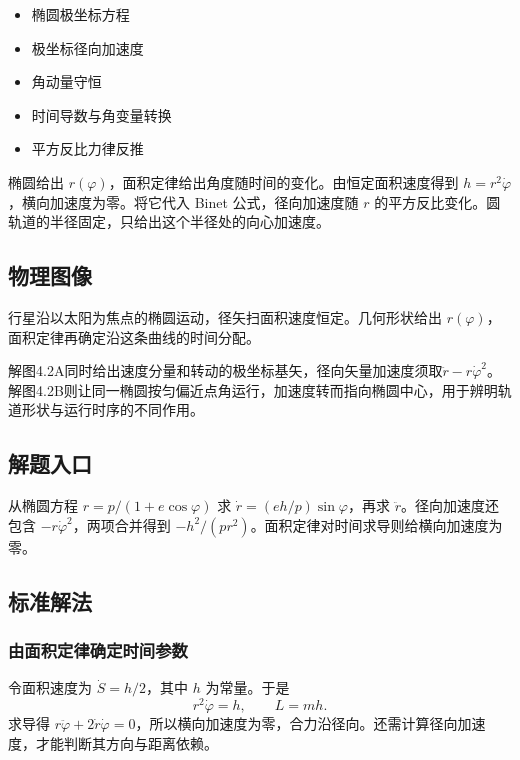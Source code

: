 \documentclass[UTF8,fontset=fandol,a4paper,11pt]{ctexart}
\providecommand{\tightlist}{\setlength{\itemsep}{0pt}\setlength{\parskip}{0pt}}
\begin{document}
\begin{itemize}
\tightlist
\item
  椭圆极坐标方程
\item
  极坐标径向加速度
\item
  角动量守恒
\item
  时间导数与角变量转换
\item
  平方反比力律反推
\end{itemize}

椭圆给出 $r(\varphi)$，面积定律给出角度随时间的变化。由恒定面积速度得到 $h=r^2\dot\varphi$，横向加速度为零。将它代入 Binet 公式，径向加速度随 $r$ 的平方反比变化。圆轨道的半径固定，只给出这个半径处的向心加速度。




\subsection*{物理图像}

行星沿以太阳为焦点的椭圆运动，径矢扫面积速度恒定。几何形状给出
\(r(\varphi)\)，面积定律再确定沿这条曲线的时间分配。

解图4.2A同时给出速度分量和转动的极坐标基矢，径向矢量加速度须取$\ddot r-r\dot\varphi^2$。解图4.2B则让同一椭圆按匀偏近点角运行，加速度转而指向椭圆中心，用于辨明轨道形状与运行时序的不同作用。



\subsection*{解题入口}

从椭圆方程 $r=p/(1+e\cos\varphi)$ 求 $\dot r=(eh/p)\sin\varphi$，再求 $\ddot r$。径向加速度还包含 $-r\dot\varphi^2$，两项合并得到 $-h^2/(pr^2)$。面积定律对时间求导则给横向加速度为零。



\subsection*{标准解法}

\subsubsection*{由面积定律确定时间参数}
令面积速度为 $\dot S=h/2$，其中 $h$ 为常量。于是
\[
r^2\dot\varphi=h,\qquad L=mh.
\]
求导得 $r\ddot\varphi+2\dot r\dot\varphi=0$，所以横向加速度为零，合力沿径向。还需计算径向加速度，才能判断其方向与距离依赖。
\end{document}
